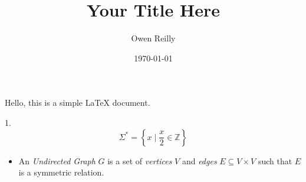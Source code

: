 \documentclass[11pt]{article}
\title{Your Title Here}
\author{Owen Reilly}
\date{\today}
\begin{document}
\maketitle

Hello, this is a simple LaTeX document.

1. \[\Sigma^* = \left\{ x \mid \frac{x}{2} \in \mathbb{Z} \right\}\]

\begin{itemize}
	\item An \emph{Undirected Graph} $G$ is a set of \emph{vertices} $V$ and \emph{edges} $E \subseteq V \times V$ such that $E$ is a symmetric relation.
\end{itemize}
\end{document}
